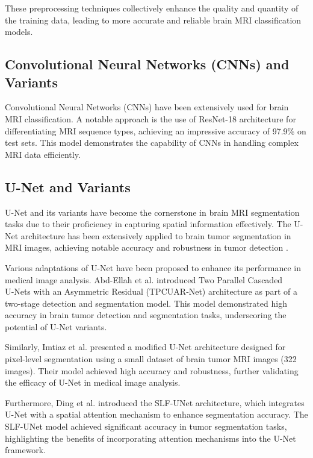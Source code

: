 These preprocessing techniques collectively enhance the quality and quantity of the training data, leading to more accurate and reliable brain MRI classification models.

\subsection{Convolutional Neural Networks (CNNs) and Variants}

Convolutional Neural Networks (CNNs) have been extensively used for brain MRI classification. A notable approach is the use of ResNet-18 architecture for differentiating MRI sequence types, achieving an impressive accuracy of 97.9\% on test sets. This model demonstrates the capability of CNNs in handling complex MRI data efficiently\cite{doi:10.1148/ryai.230095}.

\subsection{U-Net and Variants}

U-Net and its variants have become the cornerstone in brain MRI segmentation tasks due to their proficiency in capturing spatial information effectively. The U-Net architecture has been extensively applied to brain tumor segmentation in MRI images, achieving notable accuracy and robustness in tumor detection \cite{imtiaz_brain_2023, abd-ellah_automatic_2024, ding_slf-unet_2024}.

Various adaptations of U-Net have been proposed to enhance its performance in medical image analysis. Abd-Ellah et al. \cite{abd-ellah_automatic_2024} introduced Two Parallel Cascaded U‑Nets with an Asymmetric Residual (TPCUAR‑Net) architecture as part of a two-stage detection and segmentation model. This model demonstrated high accuracy in brain tumor detection and segmentation tasks, underscoring the potential of U-Net variants.

Similarly, Imtiaz et al. \cite{imtiaz_brain_2023} presented a modified U-Net architecture designed for pixel-level segmentation using a small dataset of brain tumor MRI images (322 images). Their model achieved high accuracy and robustness, further validating the efficacy of U-Net in medical image analysis.

Furthermore, Ding et al. \cite{ding_slf-unet_2024} introduced the SLF-UNet architecture, which integrates U-Net with a spatial attention mechanism to enhance segmentation accuracy. The SLF-UNet model achieved significant accuracy in tumor segmentation tasks, highlighting the benefits of incorporating attention mechanisms into the U-Net framework.

